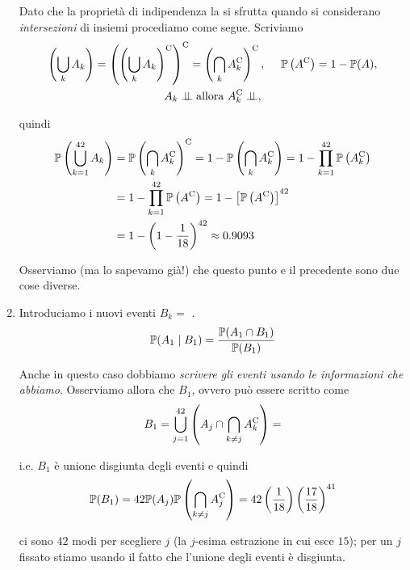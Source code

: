 \begin{enumerate}
Dato che la proprietà di indipendenza la si sfrutta quando si considerano \textit{intersezioni} di insiemi procediamo come segue. Scriviamo
\begin{gather*}
\left(\bigcup _{k} A_{k}\right) =\left(\left(\bigcup _{k} A_{k}\right)\complementary\right)\complementary =\left(\bigcap _{k} A_{k}\complementary\right)\complementary ,\ \ \ \ \PP\left(A\complementary\right) =1-\PP(A) ,\\
A_{k} \indep \text{allora} \ A_{k}\complementary \indep ,
\end{gather*}

quindi
\begin{align*}
\mathbb{P}\left(\bigcup _{k=1}^{42} A_{k}\right) & =\mathbb{P}\left(\bigcap _{k} A_{k}^{\mathrm{C}}\right)^{\mathrm{C}} =1-\mathbb{P}\left(\bigcap _{k} A_{k}^{\mathrm{C}}\right) =1-\prod _{k=1}^{42}\mathbb{P}\left(A_{k}^{\mathrm{C}}\right)\\
 & =1-\prod _{k=1}^{42}\mathbb{P}\left(A^{\mathrm{C}}\right) =1-\left[\mathbb{P}\left(A^{\mathrm{C}}\right)\right]^{42}\\
 & =1-\left(1-\frac{1}{18}\right)^{42} \approx 0.9093
\end{align*}

\begin{rem}
Osserviamo (ma lo sapevamo già!) che questo punto e il precedente sono due cose diverse.
\end{rem}
\item Introduciamo i nuovi eventi $B_{k} =$ .
\begin{equation*}
\mathbb{P}(A_{1} \mid B_{1}) =\frac{\mathbb{P}(A_{1} \cap B_{1})}{\mathbb{P}(B_{1})}
\end{equation*}

Anche in questo caso dobbiamo \textit{scrivere gli eventi usando le informazioni che abbiamo}. Osserviamo allora che $B_{1}$, ovvero  può essere scritto come
\begin{equation*}
B_{1} =\bigcup _{j=1}^{42}\left(A_{j} \cap \bigcap _{k\neq j} A_{k}^{\mathrm{C}}\right) =
\end{equation*}

i.e. $B_{1}$ è unione disgiunta degli eventi  e quindi
\begin{equation*}
\mathbb{P}(B_{1}) =42\mathbb{P}(A_{j})\mathbb{P}\left(\bigcap _{k\neq j} A_{j}^{\mathrm{C}}\right) =42\left(\frac{1}{18}\right)\left(\frac{17}{18}\right)^{41}
\end{equation*}

ci sono $42$ modi per scegliere $j$ (la $j$-esima estrazione in cui esce $15$); per un $j$ fissato stiamo usando il fatto che l'unione degli eventi è disgiunta.


\end{enumerate}
